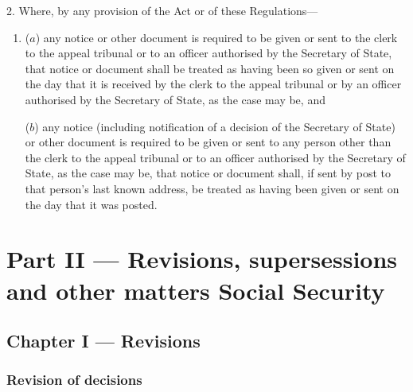 \documentclass[12pt,a4paper]{article}
\begin{document}
2.  Where, by any provision of the Act or of these Regulations—
\begin{enumerate}\item[]
($a$) any notice or other document is required to be given or sent to the clerk to the appeal tribunal or to an officer authorised by the Secretary of State, that notice or document shall be treated as having been so given or sent on the day that it is received by the clerk to the appeal tribunal or by an officer authorised by the Secretary of State, as the case may be, and

($b$) any notice (including notification of a decision of the Secretary of State) or other document is required to be given or sent to any person other than the clerk to the appeal tribunal or to an officer authorised by the Secretary of State, as the case may be, that notice or document shall, if sent by post to that person’s last known address, be treated as having been given or sent on the day that it was posted.
\end{enumerate}

\section[Part II --- Revisions, supersessions and other matters Social Security]{Part II --- Revisions, supersessions and other matters Social Security}

\subsection[Chapter I --- Revisions]{Chapter I --- Revisions}

\subsubsection[3. Revision of decisions]{Revision of decisions}

\renewcommand\parthead{--- Part II Chapter I}
\end{document}
